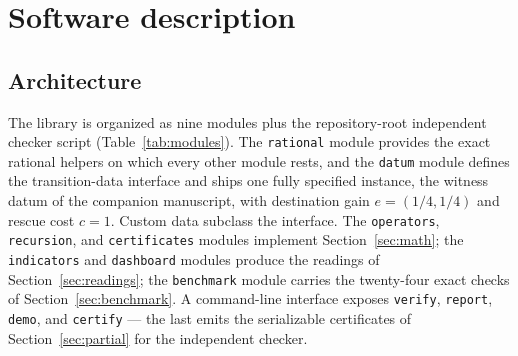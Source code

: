 \documentclass[3p,11pt]{elsarticle}
\begin{document}
\section{Software description}\label{sec:software}

\subsection{Architecture}\label{sec:architecture}

The library is organized as nine modules plus the repository-root
independent checker script (Table~\ref{tab:modules}). The
\texttt{rational} module provides the exact rational helpers on which every
other module rests, and the \texttt{datum} module defines the transition-data interface and ships one
fully specified instance, the witness datum of the companion manuscript,
with destination gain $e = (1/4, 1/4)$ and rescue cost $c = 1$. Custom data
subclass the interface. The \texttt{operators}, \texttt{recursion}, and
\texttt{certificates} modules implement Section~\ref{sec:math}; the
\texttt{indicators} and \texttt{dashboard} modules produce the readings of
Section~\ref{sec:readings}; the \texttt{benchmark} module carries the
twenty-four exact checks of Section~\ref{sec:benchmark}. A command-line
interface exposes \texttt{verify}, \texttt{report}, \texttt{demo}, and
\texttt{certify} --- the last emits the serializable certificates of
Section~\ref{sec:partial} for the independent checker.
\end{document}
